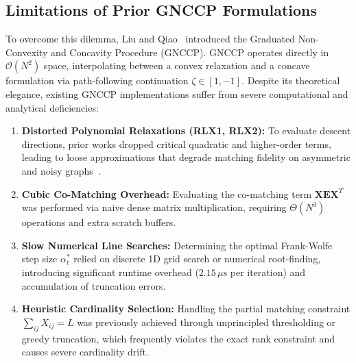 \documentclass[a4paper,fleqn]{cas-dc}
\theoremstyle{thmstyleone}
\theoremstyle{thmstyletwo}
\theoremstyle{thmstylethree}
\begin{document}
\subsection{Limitations of Prior GNCCP Formulations}
To overcome this dilemma, Liu and Qiao~\cite{liu2015graduated, yang2018algorithm} introduced the Graduated Non-Convexity and Concavity Procedure (GNCCP). GNCCP operates directly in $\mathcal{O}(N^2)$ space, interpolating between a convex relaxation and a concave formulation via path-following continuation $\zeta \in [1, -1]$. Despite its theoretical elegance, existing GNCCP implementations suffer from severe computational and analytical deficiencies:
\begin{enumerate}
    \item \textbf{Distorted Polynomial Relaxations (RLX1, RLX2):} To evaluate descent directions, prior works dropped critical quadratic and higher-order terms, leading to loose approximations that degrade matching fidelity on asymmetric and noisy graphs~\cite{yang2018algorithm}.
    \item \textbf{Cubic Co-Matching Overhead:} Evaluating the co-matching term $\mathbf{X}\mathbf{E}\mathbf{X}^T$ was performed via naive dense matrix multiplication, requiring $\Theta(N^3)$ operations and extra scratch buffers.
    \item \textbf{Slow Numerical Line Searches:} Determining the optimal Frank-Wolfe step size $\alpha_t^*$ relied on discrete 1D grid search or numerical root-finding, introducing significant runtime overhead ($2.15\,\mu\text{s}$ per iteration) and accumulation of truncation errors.
    \item \textbf{Heuristic Cardinality Selection:} Handling the partial matching constraint $\sum_{ij} X_{ij} = L$ was previously achieved through unprincipled thresholding or greedy truncation, which frequently violates the exact rank constraint and causes severe cardinality drift.
\end{enumerate}
\end{document}
